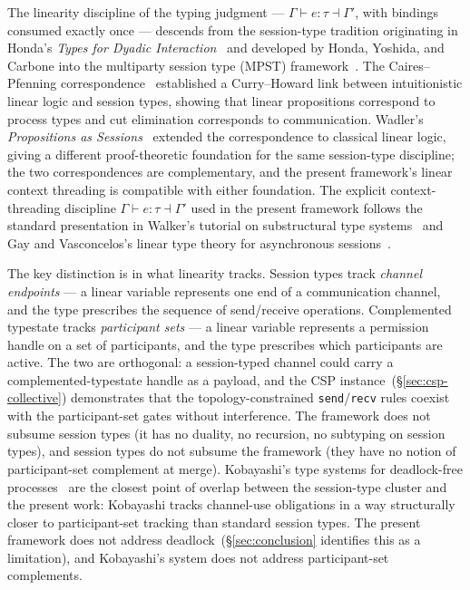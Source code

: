 \documentclass[acmsmall,screen,review,anonymous,nonacm]{acmart}
\begin{document}
The linearity discipline of the typing judgment --- $\Gamma \vdash e : \tau \dashv \Gamma'$, with bindings consumed exactly once --- descends from the session-type tradition originating in Honda's \emph{Types for Dyadic Interaction}~\cite{honda:concur:1993} and developed by Honda, Yoshida, and Carbone into the multiparty session type (MPST) framework~\cite{honda:popl:2008}. The Caires--Pfenning correspondence~\cite{caires:concur:2010} established a Curry--Howard link between intuitionistic linear logic and session types, showing that linear propositions correspond to process types and cut elimination corresponds to communication. Wadler's \emph{Propositions as Sessions}~\cite{wadler:icfp:2012} extended the correspondence to classical linear logic, giving a different proof-theoretic foundation for the same session-type discipline; the two correspondences are complementary, and the present framework's linear context threading is compatible with either foundation. The explicit context-threading discipline $\Gamma \vdash e : \tau \dashv \Gamma'$ used in the present framework follows the standard presentation in Walker's tutorial on substructural type systems~\cite{walker:attapl:2005} and Gay and Vasconcelos's linear type theory for asynchronous sessions~\cite{gay:jfp:2010}.

The key distinction is in what linearity tracks. Session types track \emph{channel endpoints} --- a linear variable represents one end of a communication channel, and the type prescribes the sequence of send/receive operations. Complemented typestate tracks \emph{participant sets} --- a linear variable represents a permission handle on a set of participants, and the type prescribes which participants are active. The two are orthogonal: a session-typed channel could carry a complemented-typestate handle as a payload, and the CSP instance~(\S\ref{sec:csp-collective}) demonstrates that the topology-constrained \texttt{send}/\texttt{recv} rules coexist with the participant-set gates without interference. The framework does not subsume session types (it has no duality, no recursion, no subtyping on session types), and session types do not subsume the framework (they have no notion of participant-set complement at merge). Kobayashi's type systems for deadlock-free processes~\cite{kobayashi:concur:2006} are the closest point of overlap between the session-type cluster and the present work: Kobayashi tracks channel-use obligations in a way structurally closer to participant-set tracking than standard session types. The present framework does not address deadlock~(\S\ref{sec:conclusion} identifies this as a limitation), and Kobayashi's system does not address participant-set complements.
\end{document}
